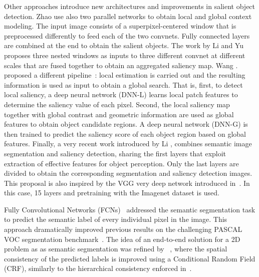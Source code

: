 \documentclass[10pt,twocolumn,letterpaper]{article}
\begin{document}
Other approaches introduce new architectures and improvements in salient object detection. Zhao \etal\cite{zhao2015saliency} use also two parallel networks to obtain local and global context modeling. The input image consists of a superpixel-centered window that is preprocessed differently to feed each of the two convnets. Fully connected layers are combined at the end to obtain the salient objects. The work by Li and Yu~\cite{liu2015visual} proposes three nested windows as inputs to three different convnet at different scales that are fused together to obtain an aggregated saliency map. Wang \etal. proposed a different pipeline~\cite{wang2015deepnetworks}: local estimation is carried out and the resulting information is used as input to obtain a global search. That is, first, to detect local saliency, a deep neural network (DNN-L) learns local patch features to determine the saliency value of each pixel. Second, the local saliency map together with global contrast and geometric information are used as global features to obtain object candidate regions. A deep neural network (DNN-G) is then trained to predict the saliency score of each object region based on global features. Finally, a very recent work introduced by Li \etal\cite{li2015deepsaliency}, combines semantic image segmentation and saliency detection, sharing the first layers that exploit extraction of effective features for object perception. Only the last layers are divided to obtain the corresponding segmentation and saliency detection images. This proposal is also inspired by the VGG very deep network introduced in~\cite{simonyan2015verydeep}. In this case, 15 layers and pretraining with the Imagenet dataset is used. 

Fully Convolutional Networks (FCNs)~\cite{long2015fully} addressed the semantic segmentation task to predict the semantic label of every individual pixel in the image. 
This approach dramatically improved previous results on the challenging PASCAL VOC segmentation benchmark~\cite{everingham2014pascal}.
The idea of an end-to-end solution for a 2D problem as as semantic segmentation was refined by ~\cite{DBLP:journals/corr/ChenPKMY14}, where the spatial consistency of the predicted labels is improved using a Conditional Random Field (CRF), similarly to the hierarchical consistency enforced in~\cite{farabet2013learning}.
\end{document}
